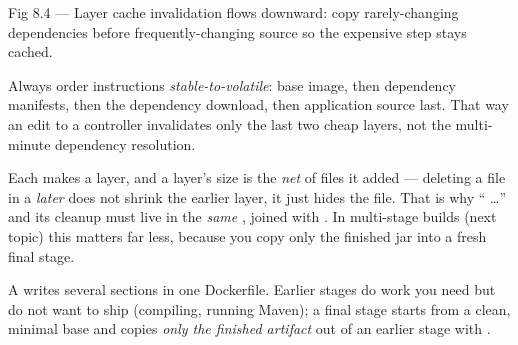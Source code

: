 \begin{wbfigure}{Fig 8.4 --- Layer cache invalidation flows downward: copy rarely-changing dependencies before frequently-changing source so the expensive step stays cached.}
\end{wbfigure}

 Always order instructions \emph{stable-to-volatile}: base image, then dependency manifests, then the dependency download, then application source last. That way an edit to a controller invalidates only the last two cheap layers, not the multi-minute dependency resolution.

\begin{perfnote}
Each  makes a layer, and a layer's size is the \emph{net} of files it added --- deleting a file in a \emph{later}  does not shrink the earlier layer, it just hides the file. That is why `` \dots'' and its cleanup must live in the \emph{same} , joined with \code{\&\&}. In multi-stage builds (next topic) this matters far less, because you copy only the finished jar into a fresh final stage.
\end{perfnote}


 A  writes several  sections in one Dockerfile. Earlier stages do work you need but do not want to ship (compiling, running Maven); a final stage starts from a clean, minimal base and copies \emph{only the finished artifact} out of an earlier stage with .

